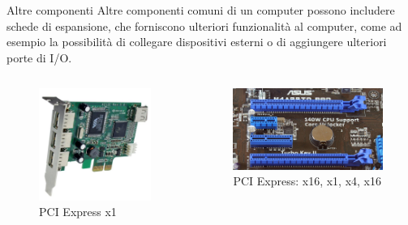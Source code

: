 \begin{frame}
	
	\begin{block}{Altre componenti}
		Altre componenti comuni di un computer possono includere schede di espansione, che forniscono ulteriori funzionalità al computer, come ad esempio la possibilità di collegare dispositivi esterni o di aggiungere ulteriori porte di I/O.
	\end{block}
	
	
	
	\begin{columns}			
		\begin{figure}[!htbp]
			\centering 
			\includegraphics[width=0.82\linewidth]{images/3_architetture/pcie_2.jpg}
			\caption{PCI Express x1}
		\end{figure}
		
		\begin{figure}[!htbp]
			\centering 
			\includegraphics[width=1.0\linewidth]{images/3_architetture/pcie_1.jpg}
			\caption{PCI Express: x16, x1, x4, x16}
		\end{figure}
	\end{columns}
	
\end{frame}


